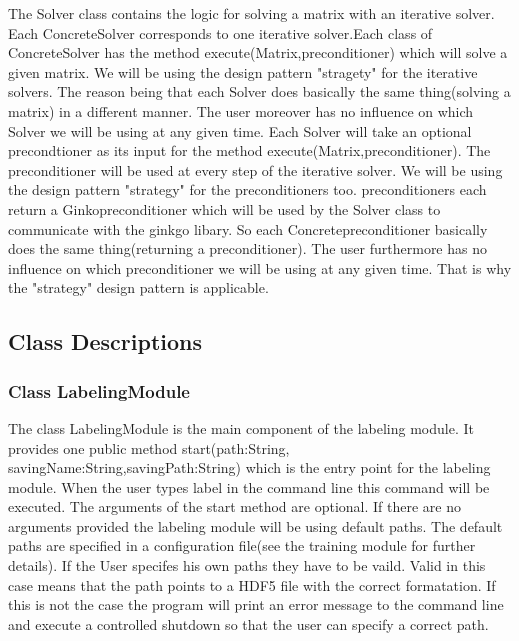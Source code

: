 \documentclass[parskip=full]{scrartcl}
\begin{document}
The Solver class contains the logic for solving a matrix with an \gls{iterative solver}.
Each ConcreteSolver corresponds to one \gls{iterative solver}.Each class of ConcreteSolver has the method execute(Matrix,\gls{preconditioner}) which will solve a given matrix.
We will be using the design pattern "stragety" for the \gls{iterative solver}s.
The reason being that each Solver does basically the same thing(solving a matrix) in a different manner.
The user moreover has no influence on which Solver we will be using at any given time.
Each Solver will take an optional precondtioner as its input for the method execute(Matrix,\gls{preconditioner}).
The \gls{preconditioner} will be used at every step of the \gls{iterative solver}.
We will be using the design pattern "\gls{strategy}" for the \gls{preconditioner}s too. \gls{preconditioner}s each return a Ginko\gls{preconditioner} which will be used by the Solver class to communicate with the ginkgo libary.
So each Concrete\gls{preconditioner} basically does the same thing(returning a \gls{preconditioner}).
The user furthermore has no influence on which \gls{preconditioner} we will be using at any given time. That is why the "\gls{strategy}" design pattern is applicable.

\subsection{Class Descriptions}

\subsubsection{Class LabelingModule}
The class LabelingModule is the main component of the labeling module.
It provides one public method start(path:String, savingName:String,savingPath:String) which is the entry point for the labeling module.
When the user types label in the command line this command will be executed.
The arguments of the start method are optional.
If there are no arguments provided the labeling module will be using default paths.
The default paths are specified in a configuration file(see the training module for further details).
If the User specifes his own paths they have to be vaild.
Valid in this case means that the path points to a \gls{HDF5} file with the correct formatation.
If this is not the case the program will print an error message to the command line and execute a controlled shutdown so that the user can specify a correct path.
\end{document}
